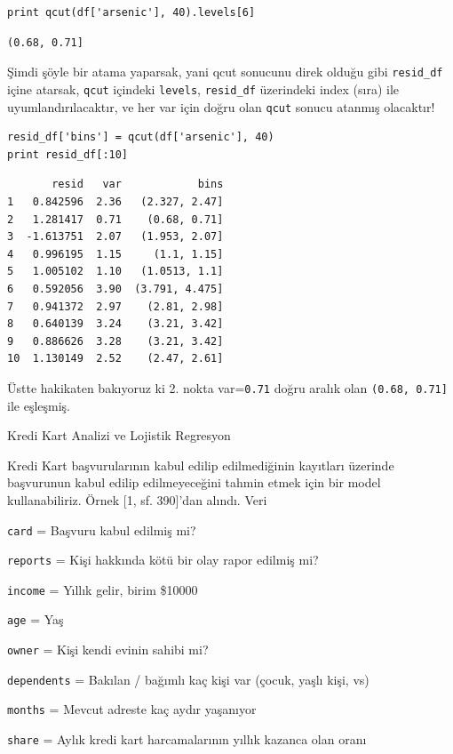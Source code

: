 \documentclass[12pt,fleqn]{article}\usepackage{../../common}
\begin{document}
\begin{verbatim}
print qcut(df['arsenic'], 40).levels[6]
\end{verbatim}

\begin{verbatim}
(0.68, 0.71]
\end{verbatim}

Şimdi şöyle bir atama yaparsak, yani qcut sonucunu direk olduğu gibi
\verb!resid_df! içine atarsak, \verb!qcut! içindeki \verb!levels!,
\verb!resid_df!  üzerindeki index (sıra) ile uyumlandırılacaktır, ve her var
için doğru olan \verb!qcut! sonucu atanmış olacaktır!

\begin{verbatim}
resid_df['bins'] = qcut(df['arsenic'], 40)
print resid_df[:10]
\end{verbatim}

\begin{verbatim}
       resid   var            bins
1   0.842596  2.36   (2.327, 2.47]
2   1.281417  0.71    (0.68, 0.71]
3  -1.613751  2.07   (1.953, 2.07]
4   0.996195  1.15     (1.1, 1.15]
5   1.005102  1.10   (1.0513, 1.1]
6   0.592056  3.90  (3.791, 4.475]
7   0.941372  2.97    (2.81, 2.98]
8   0.640139  3.24    (3.21, 3.42]
9   0.886626  3.28    (3.21, 3.42]
10  1.130149  2.52    (2.47, 2.61]
\end{verbatim}

Üstte hakikaten bakıyoruz ki 2. nokta var=\verb!0.71! doğru aralık olan
\verb!(0.68, 0.71]! ile eşleşmiş.

Kredi Kart Analizi ve Lojistik Regresyon

Kredi Kart başvurularının kabul edilip edilmediğinin kayıtları üzerinde
başvurunun kabul edilip edilmeyeceğini tahmin etmek için bir model
kullanabiliriz. Örnek [1, sf. 390]'dan alındı. Veri

\verb!card! = Başvuru kabul edilmiş mi? 

\verb!reports! = Kişi hakkında kötü bir olay rapor edilmiş mi?

\verb!income! = Yıllık gelir, birim \$10000

\verb!age! = Yaş

\verb!owner! = Kişi kendi evinin sahibi mi?

\verb!dependents! = Bakılan / bağımlı kaç kişi var (çocuk, yaşlı kişi, vs)

\verb!months! = Mevcut adreste kaç aydır yaşanıyor

\verb!share! = Aylık kredi kart harcamalarının yıllık kazanca olan oranı
\end{document}
